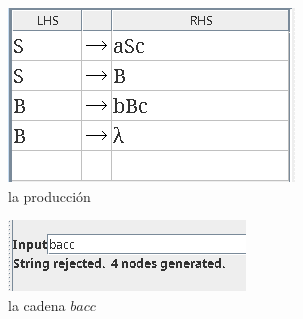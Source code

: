 \documentclass{article}
\begin{document}
\begin{flushleft}
\begin{enumerate}
                \begin{figure}[h] 
                    \centering
                    \begin{subfigure}[b]{0.45\textwidth}
                        \centering
                        \includegraphics[width=\textwidth]{./Imagenes/produccion6.png}
                        \caption{la producción}
                        \label{fig:label22}
                    \end{subfigure}
                    \hfill
                    \begin{subfigure}[b]{0.45\textwidth}
                        \centering
                        \includegraphics[width=\textwidth]{./Imagenes/grado11.png}
                        \caption{la cadena $bacc$}
                        \label{fig:label23}
                    \end{subfigure}
                    \vspace{0.5cm} 
                    \\
                    \begin{subfigure}[b]{0.45\textwidth}
                        \centering

\end{subfigure}
\end{figure}
\end{enumerate}
\end{flushleft}
\end{document}
